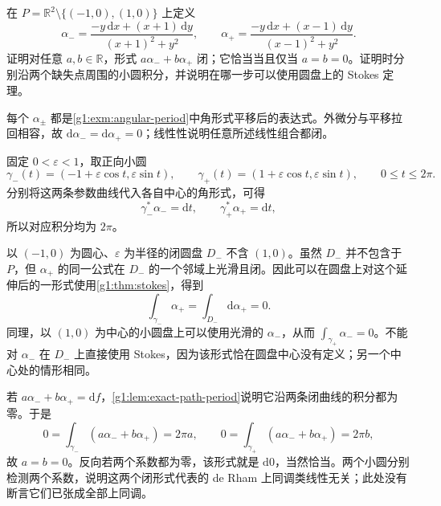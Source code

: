 \begin{exercise}\label{g1:ex:two-puncture-independent-periods}
	在 \(P=\mathbb R^2\setminus\{(-1,0),(1,0)\}\) 上定义
	\[
		\alpha_-=\frac{-y\,\mathrm{d}x+(x+1)\,\mathrm{d}y}{(x+1)^2+y^2},\qquad
		\alpha_+=\frac{-y\,\mathrm{d}x+(x-1)\,\mathrm{d}y}{(x-1)^2+y^2}.
	\]
	证明对任意 \(a,b\in\mathbb R\)，形式 \(a\alpha_-+b\alpha_+\) 闭；它恰当当且仅当 \(a=b=0\)。证明时分别沿两个缺失点周围的小圆积分，并说明在哪一步可以使用圆盘上的 Stokes 定理。
\end{exercise}
\begin{solution}
	每个 \(\alpha_\pm\) 都是\cref{g1:exm:angular-period}中角形式平移后的表达式。外微分与平移拉回相容，故 \(\mathrm{d}\alpha_-=\mathrm{d}\alpha_+=0\)；线性性说明任意所述线性组合都闭。

	固定 \(0<\varepsilon<1\)，取正向小圆
	\[
		\gamma_-(t)=(-1+\varepsilon\cos t,\varepsilon\sin t),\qquad
		\gamma_+(t)=(1+\varepsilon\cos t,\varepsilon\sin t),\qquad 0\le t\le2\pi.
	\]
	分别将这两条参数曲线代入各自中心的角形式，可得
	\[
		\gamma_-^*\alpha_-=\mathrm{d}t,\qquad
		\gamma_+^*\alpha_+=\mathrm{d}t,
	\]
	所以对应积分均为 \(2\pi\)。

	以 \((-1,0)\) 为圆心、\(\varepsilon\) 为半径的闭圆盘 \(D_-\) 不含 \((1,0)\)。虽然 \(D_-\) 并不包含于 \(P\)，但 \(\alpha_+\) 的同一公式在 \(D_-\) 的一个邻域上光滑且闭。因此可以在圆盘上对这个延伸后的一形式使用\cref{g1:thm:stokes}，得到
	\[
		\int_{\gamma_-}\alpha_+=\int_{D_-}\mathrm{d}\alpha_+=0.
	\]
	同理，以 \((1,0)\) 为中心的小圆盘上可以使用光滑的 \(\alpha_-\)，从而 \(\int_{\gamma_+}\alpha_-=0\)。不能对 \(\alpha_-\) 在 \(D_-\) 上直接使用 Stokes，因为该形式恰在圆盘中心没有定义；另一个中心处的情形相同。

	若 \(a\alpha_-+b\alpha_+=\mathrm{d}f\)，\cref{g1:lem:exact-path-period}说明它沿两条闭曲线的积分都为零。于是
	\[
		0=\int_{\gamma_-}(a\alpha_-+b\alpha_+)=2\pi a,\qquad
		0=\int_{\gamma_+}(a\alpha_-+b\alpha_+)=2\pi b,
	\]
	故 \(a=b=0\)。反向若两个系数都为零，该形式就是 \(\mathrm{d}0\)，当然恰当。两个小圆分别检测两个系数，说明这两个闭形式代表的 de Rham 上同调类线性无关；此处没有断言它们已张成全部上同调。
\end{solution}

